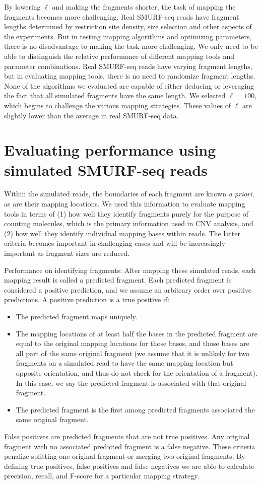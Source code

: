 By lowering $\ell$ and making the fragments shorter, the task of
mapping the fragments becomes more challenging. Real SMURF-seq reads
have fragment lengths determined by restriction site density, size
selection and other aspects of the experiments. But in testing mapping
algorithms and optimizing parameters, there is no disadvantage to
making the task more challenging. We only need to be able to
distinguish the relative performance of different mapping tools and
parameter combinations. Real SMURF-seq reads have varying fragment
lengths, but in evaluating mapping tools, there is no need to
randomize fragment lengths. None of the algorithms we evaluated are
capable of either deducing or leveraging the fact that all simulated
fragments have the same length. We selected $\ell = 100$, which
begins to challenge the various mapping strategies. These values of
$\ell$ are slightly lower than the average in real SMURF-seq data.


\section*{Evaluating performance using simulated SMURF-seq reads}
Within the simulated reads, the boundaries of each fragment are known
\textit{a priori}, as are their mapping locations. We used this
information to evaluate mapping tools in terms of (1) how well they
identify fragments purely for the purpose of counting molecules, which
is the primary information used in CNV analysis, and (2) how well they
identify individual mapping bases within reads. The latter criteria
becomes important in challenging cases and will be increasingly
important as fragment sizes are reduced.

Performance on identifying fragments: After mapping these simulated
reads, each mapping result is called a predicted fragment. Each
predicted fragment is considered a positive prediction, and we assume
an arbitrary order over positive predictions. A positive prediction is
a true positive if:
\begin{itemize}
\item The predicted fragment maps uniquely.
\item The mapping locations of at least half the bases in the
  predicted fragment are equal to the original mapping locations for
  those bases, and those bases are all part of the same original
  fragment (we assume that it is unlikely for two fragments on a simulated
  read to have the same mapping location but opposite orientation, and thus
  do not check for the orientation of a fragment). In this case, we say the
  predicted fragment is associated with that original fragment.
\item The predicted fragment is the first among predicted fragments
  associated the same original fragment.
\end{itemize}
False positives are predicted fragments that are not true positives. Any
original fragment with no associated predicted fragment is a false
negative. These criteria penalize splitting one original fragment or
merging two original fragments. By defining true positives, false
positives and false negatives we are able to calculate precision,
recall, and F-score for a particular mapping strategy.

